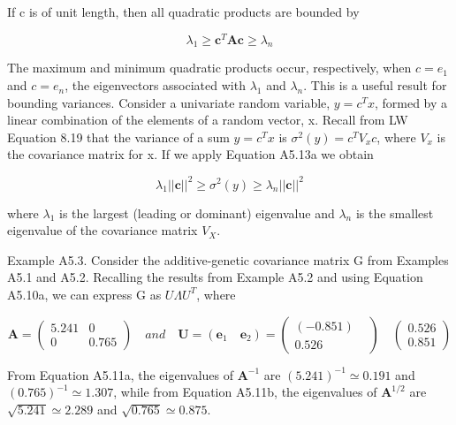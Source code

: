 \documentclass{article}
\begin{document}
If c is of unit length, then all quadratic products are bounded by

\begin{equation}
\lambda_{1}\geq\mathbf{c}^{T}\mathbf{A}\mathbf{c}\geq\lambda_{n}
\end{equation}

The maximum and minimum quadratic products occur, respectively, when  $ c = e_1 $ and  $ c = e_n $, the eigenvectors associated with  $ \lambda_1 $ and  $ \lambda_n $. This is a useful result for bounding variances. Consider a univariate random variable,  $ y = c^T x $, formed by a linear combination of the elements of a random vector, x. Recall from LW Equation 8.19 that the variance of a sum  $ y = c^T x $ is  $ \sigma^2(y) = c^T V_x c $, where  $ V_x $ is the covariance matrix for x. If we apply Equation A5.13a we obtain

\begin{equation}
\lambda_{1}||\mathbf{c}||^{2}\geq\sigma^{2}(y)\geq\lambda_{n}||\mathbf{c}||^{2}
\end{equation}

where  $ \lambda_{1} $ is the largest (leading or dominant) eigenvalue and  $ \lambda_{n} $ is the smallest eigenvalue of the covariance matrix  $ V_{X} $.

Example A5.3. Consider the additive-genetic covariance matrix G from Examples A5.1 and A5.2. Recalling the results from Example A5.2 and using Equation A5.10a, we can express G as  $ U\Lambda U^{T} $, where

\begin{equation}
\boldsymbol{A}=\left(\begin{array}{cc}{{{5.241}}}&{{{0}}} \\{{{0}}}&{{{0.765}}}\end{array}\right)\quad and\quad\mathbf{U}=(\mathbf{e}_{1}\quad\mathbf{e}_{2})=\left(\begin{array}{cc}\left(-0.851\right)&\\0.526&\end{array}\right)\quad\left(\begin{array}{l}{{{0.526}}} \\{{{0.851}}}\end{array}\right)
\end{equation}

From Equation A5.11a, the eigenvalues of  $ \mathbf{A}^{-1} $ are  $ (5.241)^{-1} \simeq 0.191 $ and  $ (0.765)^{-1} \simeq 1.307 $, while from Equation A5.11b, the eigenvalues of  $ \mathbf{A}^{1/2} $ are  $ \sqrt{5.241} \simeq 2.289 $ and  $ \sqrt{0.765} \simeq 0.875 $.
\end{document}
